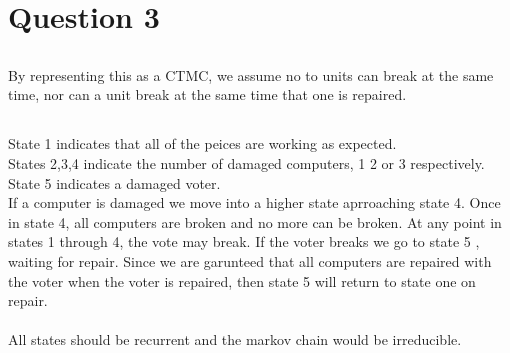 \documentclass{article}
\begin{document}
\section*{Question 3}
\subsection*{}
By representing this as a CTMC, we assume no to units can break at the same
time, nor can a unit break at the same time that one is repaired. 
\subsection*{} State 1 indicates that all of the peices are working as expected. 
\\States 2,3,4 indicate the number of damaged computers, 1 2 or 3 respectively. 
\\State 5 indicates a damaged voter. 
\\If a computer is damaged we move into a higher state aprroaching state 4. Once
in state 4, all computers are broken and no more can be broken. At any point in
states 1 through 4, the vote may break. If the voter breaks we go to state 5 ,
waiting for repair. Since we are garunteed that all computers are repaired with
the voter when the voter is repaired, then state 5 will return to state one on
repair. 
\\
\\All states should be recurrent and the markov chain would be irreducible. 
 \subsection*{} 
\end{document}
